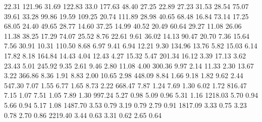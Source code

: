   22.31  121.96  31.69  122.83  33.0  177.63  48.40
  27.25  22.89  27.23   31.53  28.54   75.07  39.61
  33.28  99.86  19.59  109.25  20.74  111.89  28.98
  40.65  68.48  16.84   73.14  17.25   68.05  24.40
  49.65  28.77  14.60   37.25  14.99   40.52  20.49
  60.64  29.27  11.08   26.06  11.38   38.25  17.29
  74.07  25.52   8.76   22.61   9.61   36.02  14.13
  90.47  20.70   7.36   15.64   7.56   30.91  10.31
 110.50   8.68   6.97    9.41   6.94   12.21   9.30
 134.96  13.76   5.82   15.03   6.14   17.82   8.18
 164.84  14.43   4.04   12.43   4.27   15.32   5.47
 201.34  16.12   3.39   17.13   3.62   23.43   5.01
 245.92   9.35   2.61    9.46   2.80   11.08   4.00
 300.36   9.97   2.14   11.33   2.30   13.67   3.22
 366.86   8.36   1.91    8.83   2.00   10.65   2.98
 448.09   8.84   1.66    9.18   1.82    9.62   2.44
 547.30   7.07   1.55    6.77   1.65    8.73   2.22
 668.47   7.87   1.24    7.69   1.30    6.02   1.72
 816.47   7.15   1.07    7.51   1.05    7.89   1.30
 997.24   5.27   0.98    5.09   0.96    5.31   1.16
1218.03   5.70   0.94    5.66   0.94    5.17   1.08
1487.70   3.53   0.79    3.19   0.79    2.79   0.91
1817.09   3.33   0.75    3.23   0.78    2.70   0.86
2219.40   3.44   0.63    3.31   0.62    2.65   0.64

